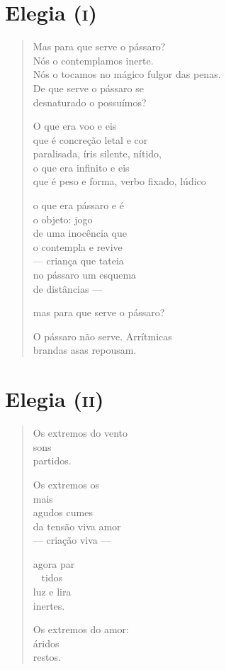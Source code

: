 \chapter{Elegia (\textsc{i})}

\begin{verse}
Mas para que serve o pássaro?\\
Nós o contemplamos inerte.\\
Nós o tocamos no mágico fulgor das penas.\\
De que serve o pássaro se\\
desnaturado o possuímos?

O que era voo e eis\\
que é concreção letal e cor\\
paralisada, íris silente, nítido,\\
o que era infinito e eis\\
que é peso e forma, verbo fixado, lúdico

o que era pássaro e é\\
o objeto: jogo\\
de uma inocência que\\
o contempla e revive\\
--- criança que tateia\\
no pássaro um esquema\\
de distâncias ---

mas para que serve o pássaro?

O pássaro não serve. Arrítmicas\\
brandas asas repousam.
\end{verse}

\chapter{Elegia (\textsc{ii})}

\begin{verse}
Os extremos do vento\\
sons\\
partidos.

Os extremos os\\
mais\\
agudos cumes\\
da tensão viva amor\\
--- criação viva ---

agora par\\
\qquad\mbox{ } tidos\\
luz e lira\\
inertes.

Os extremos do amor:\\
áridos\\
restos.
\end{verse}


